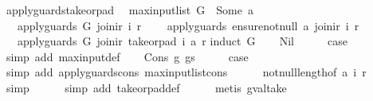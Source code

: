 \begin{isabellebody}
\ apply{\isacharunderscore}guards{\isacharunderscore}take{\isacharunderscore}or{\isacharunderscore}pad{\isacharcolon}\isanewline
\ \ {\isachardoublequoteopen}max{\isacharunderscore}input{\isacharunderscore}list\ G\ {\isacharless}\ Some\ a\ {\isasymLongrightarrow}\isanewline
\ \ \ apply{\isacharunderscore}guards\ G\ {\isacharparenleft}join{\isacharunderscore}ir\ i\ r{\isacharparenright}\ {\isasymLongrightarrow}\isanewline
\ \ \ apply{\isacharunderscore}guards\ {\isacharparenleft}ensure{\isacharunderscore}not{\isacharunderscore}null\ a{\isacharparenright}\ {\isacharparenleft}join{\isacharunderscore}ir\ i\ r{\isacharparenright}\ {\isasymLongrightarrow}\isanewline
\ \ \ apply{\isacharunderscore}guards\ G\ {\isacharparenleft}join{\isacharunderscore}ir\ {\isacharparenleft}take{\isacharunderscore}or{\isacharunderscore}pad\ i\ a{\isacharparenright}\ r{\isacharparenright}{\isachardoublequoteclose}\isanewline
%
\isadelimproof
%
\endisadelimproof
%
\isatagproof
{}\isamarkupfalse%
{\isacharparenleft}induct\ G{\isacharparenright}\isanewline
\ \ \isamarkupfalse%
\ Nil\isanewline
\ \ \isamarkupfalse%
\ \isamarkupfalse%
\ {\isacharquery}case\isanewline
\ \ \ \ \isamarkupfalse%
\ {\isacharparenleft}simp\ add{\isacharcolon}\ max{\isacharunderscore}input{\isacharunderscore}def{\isacharparenright}\isanewline
{}\isamarkupfalse%
\isanewline
\ \ \isamarkupfalse%
\ {\isacharparenleft}Cons\ g\ gs{\isacharparenright}\isanewline
\ \ \isamarkupfalse%
\ \isamarkupfalse%
\ {\isacharquery}case\isanewline
\ \ \ \ \isamarkupfalse%
\ {\isacharparenleft}simp\ add{\isacharcolon}\ apply{\isacharunderscore}guards{\isacharunderscore}cons\ max{\isacharunderscore}input{\isacharunderscore}list{\isacharunderscore}cons{\isacharparenright}\isanewline
\ \ \ \ \isamarkupfalse%
\ not{\isacharunderscore}null{\isacharunderscore}length{\isacharbrackleft}of\ a\ i\ r{\isacharbrackright}\isanewline
\ \ \ \ \isamarkupfalse%
\ simp\isanewline
\ \ \ \ \isamarkupfalse%
\ {\isacharparenleft}simp\ add{\isacharcolon}\ take{\isacharunderscore}or{\isacharunderscore}pad{\isacharunderscore}def{\isacharparenright}\isanewline
\ \ \ \ \isamarkupfalse%
\ {\isacharparenleft}metis\ gval{\isacharunderscore}take{\isacharparenright}\isanewline
{}\isamarkupfalse%
%
\endisatagproof
{\isafoldproof}%
%
\isadelimproof
\isanewline
%
\endisadelimproof
\isanewline
{}\isamarkupfalse%

\end{isabellebody}
